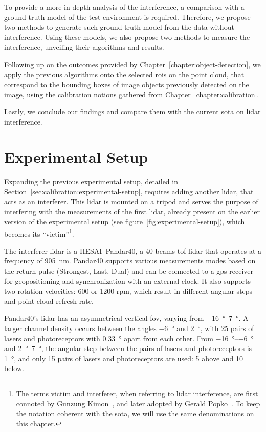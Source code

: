 To provide a more in-depth analysis of the interference, a comparison with a ground-truth model of the test environment is required. Therefore, we propose two methods to generate such ground truth model from the data without interference. Using these models, we also propose two methods to measure the interference, unveiling their algorithms and results.

Following up on the outcomes provided by Chapter~\ref{chapter:object-detection}, we apply the previous algorithms onto the selected \acp{roi} on the point cloud, that correspond to the bounding boxes of image objects previously detected on the image, using the calibration notions gathered from Chapter~\ref{chapter:calibration}.

Lastly, we conclude our findings and compare them with the current \acl{sota} on \ac{lidar} interference.

\section{Experimental Setup}
\label{sec:lidar-interference:experimental-setup}

Expanding the previous experimental setup, detailed in Section~\ref{sec:calibration:experimental-setup}, requires adding another \ac{lidar}, that acts as an interferer. This \ac{lidar} is mounted on a tripod and serves the purpose of interfering with the measurements of the first \ac{lidar}, already present on the earlier version of the experimental setup (see figure~\ref{fig:experimental-setup}), which becomes its ``victim''\footnote{The terms victim and interferer, when referring to \ac{lidar} interference, are first connoted by Gunzung Kim\etal on~\cite{Kim2015a, Kim2015b, Kim2015c, Kim2017}, and later adopted by Gerald Popko\etal~\cite{Popko2019a, Popko2019b}. To keep the notation coherent with the \acl{sota}, we will use the same denominations on this chapter.}.

The interferer \ac{lidar} is a HESAI\cp~Pandar40\texttrademark, a 40 beams \ac{tof} \ac{lidar} that operates at a frequency of \SI{905}{\nano\meter}. Pandar40 supports various measurements modes based on the return pulse (Strongest, Last, Dual) and can be connected to a \ac{gps} receiver for geopositioning and synchronization with an external clock. It also supports two rotation velocities: 600 or 1200 \ac{rpm}, which result in different angular steps and point cloud refresh rate. 

Pandar40's \ac{lidar} has an asymmetrical vertical \ac{fov}, varying from \SIrange{-16}{+7}{\degree}. A larger channel density occurs between the angles \SI{-6}{\degree} and \SI{+2}{\degree}, with 25 pairs of lasers and photoreceptors with \SI{0.33}{\degree} apart from each other. From \SIrange{-16}{-6}{\degree} and \SIrange{+2}{+7}{\degree}, the angular step between the pairs of lasers and photoreceptors is \SI{1}{\degree}, and only 15 pairs of lasers and photoreceptors are used: 5 above and 10 below.

